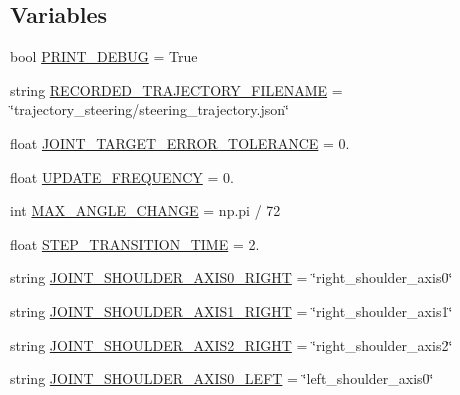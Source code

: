 \subsection*{Variables}
\begin{DoxyCompactItemize}
\item 
bool \mbox{\hyperlink{namespacesteering__simulation_a13db823567e2a46183a6887d72165d65}{P\+R\+I\+N\+T\+\_\+\+D\+E\+B\+UG}} = True
\item 
string \mbox{\hyperlink{namespacesteering__simulation_ab4de54bdf1b917546004a6eb92a8cd27}{R\+E\+C\+O\+R\+D\+E\+D\+\_\+\+T\+R\+A\+J\+E\+C\+T\+O\+R\+Y\+\_\+\+F\+I\+L\+E\+N\+A\+ME}} = \char`\"{}trajectory\+\_\+steering/steering\+\_\+trajectory.\+json\char`\"{}
\item 
float \mbox{\hyperlink{namespacesteering__simulation_a9d7ce571547e355ac4b1794548af1682}{J\+O\+I\+N\+T\+\_\+\+T\+A\+R\+G\+E\+T\+\_\+\+E\+R\+R\+O\+R\+\_\+\+T\+O\+L\+E\+R\+A\+N\+CE}} = 0.
\item 
float \mbox{\hyperlink{namespacesteering__simulation_aa98f000080f13c942c2287914f8ef406}{U\+P\+D\+A\+T\+E\+\_\+\+F\+R\+E\+Q\+U\+E\+N\+CY}} = 0.
\item 
int \mbox{\hyperlink{namespacesteering__simulation_af6a6a70049e66b65e195d32a0e566f39}{M\+A\+X\+\_\+\+A\+N\+G\+L\+E\+\_\+\+C\+H\+A\+N\+GE}} = np.\+pi / 72
\item 
float \mbox{\hyperlink{namespacesteering__simulation_a4f4712994f92a7c212a9fc29f90efafd}{S\+T\+E\+P\+\_\+\+T\+R\+A\+N\+S\+I\+T\+I\+O\+N\+\_\+\+T\+I\+ME}} = 2.
\item 
string \mbox{\hyperlink{namespacesteering__simulation_aa17ebfc23242a5eb70e77d1c7b838b41}{J\+O\+I\+N\+T\+\_\+\+S\+H\+O\+U\+L\+D\+E\+R\+\_\+\+A\+X\+I\+S0\+\_\+\+R\+I\+G\+HT}} = \char`\"{}right\+\_\+shoulder\+\_\+axis0\char`\"{}
\item 
string \mbox{\hyperlink{namespacesteering__simulation_a30fbab19241dfbe329ee608a9c47a31b}{J\+O\+I\+N\+T\+\_\+\+S\+H\+O\+U\+L\+D\+E\+R\+\_\+\+A\+X\+I\+S1\+\_\+\+R\+I\+G\+HT}} = \char`\"{}right\+\_\+shoulder\+\_\+axis1\char`\"{}
\item 
string \mbox{\hyperlink{namespacesteering__simulation_a11b82fa8fdda843272cc39e43abc48e5}{J\+O\+I\+N\+T\+\_\+\+S\+H\+O\+U\+L\+D\+E\+R\+\_\+\+A\+X\+I\+S2\+\_\+\+R\+I\+G\+HT}} = \char`\"{}right\+\_\+shoulder\+\_\+axis2\char`\"{}
\item 
string \mbox{\hyperlink{namespacesteering__simulation_a349c0f63ddcdf619cf509dceff5f53a6}{J\+O\+I\+N\+T\+\_\+\+S\+H\+O\+U\+L\+D\+E\+R\+\_\+\+A\+X\+I\+S0\+\_\+\+L\+E\+FT}} = \char`\"{}left\+\_\+shoulder\+\_\+axis0\char`\"{}

\end{DoxyCompactItemize}

